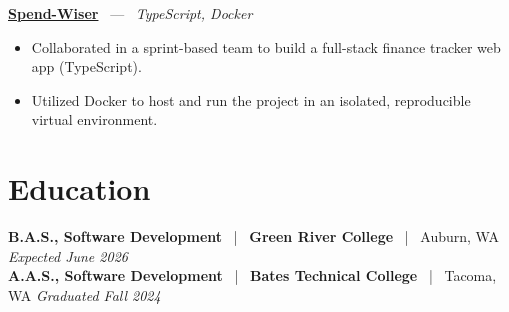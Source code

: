 \documentclass[10pt, letterpaper]{article}
\newcommand{\jobhead}[4]{%
  \vspace{5pt}%
  {\bfseries\color{dark}#1}%
  ~{\color{light}|}~%
  {\bfseries\color{navy}#2}%
  ~{\color{light}|}~%
  {\color{light}#3}%
  \hfill{\color{light}\small\textit{#4}}\\[-2pt]%
}
\newcommand{\projhead}[3]{%
  \vspace{5pt}%
  {\bfseries\color{dark}\href{#2}{#1}}%
  ~{\color{light}---}~%
  {\color{light}\small\textit{#3}}\\[-2pt]%
}
\begin{document}
\projhead{Spend-Wiser}{https://github.com/JesseChum/w26-sdev372-spendwiser-finance-tracker}{TypeScript, Docker}
\begin{itemize}
  \item Collaborated in a sprint-based team to build a full-stack finance tracker web app (TypeScript).
  \item Utilized Docker to host and run the project in an isolated, reproducible virtual environment.
\end{itemize}

\section{Education}

\jobhead{B.A.S., Software Development}{Green River College}{Auburn, WA}{Expected June 2026}
\jobhead{A.A.S., Software Development}{Bates Technical College}{Tacoma, WA}{Graduated Fall 2024}
\end{document}
